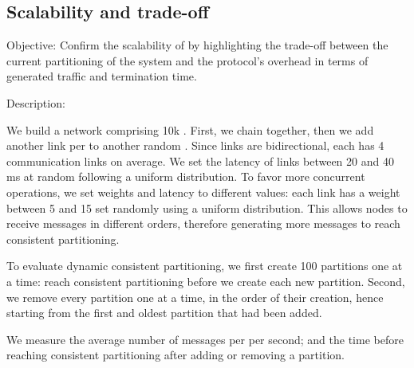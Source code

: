 \subsection{Scalability and trade-off}
\begin{asparadesc}
\item [Objective:] Confirm the scalability of \NAME by highlighting the
  trade-off between the current partitioning of the system and the
  protocol's overhead in terms of generated traffic and termination
  time.
  
\item [Description:]
  
We build a network comprising 10k \processes. First, we chain
\processes together, then we add another link per
\process to another random \process. Since links are bidirectional,
each \process has 4 communication links on average. We set the latency
of links between 20 and 40 ms at random following a uniform
distribution.
%
To favor more concurrent operations, we %
set
weights and latency to different values: each link has a weight
between 5 and 15 set randomly using a uniform distribution. This
allows nodes to receive messages in different orders, %
therefore generating more messages to reach consistent
partitioning.


\noindent To evaluate dynamic consistent partitioning, we first
create 100 partitions one at a time: \processes reach consistent
partitioning before we create each new partition. Second, we remove
every partition one at a time, in the order of their creation, hence
starting from the first and oldest partition that had been added.

\noindent We measure the average number of messages %
per
\process per second; and the time before reaching consistent
partitioning after adding or removing a partition.




\end{asparadesc}

